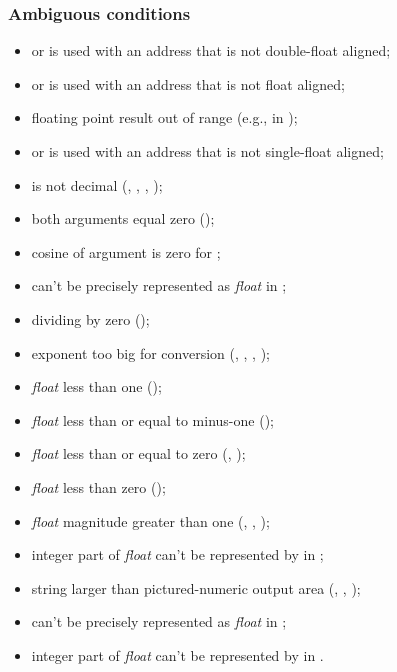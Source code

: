 \subsubsection{Ambiguous conditions} %
\label{float:ambiguous}
\begin{itemize}
\item {} or  is used with an address that is not
	double-float aligned;
\item {} or  is used with an address that is not
	float aligned;
\item floating point result out of range
	(e.g., in );
\item {} or  is used with an address that is not
	single-float aligned;
\item {} is not decimal
	(,
	 ,
	 ,
	 );
\item both arguments equal zero ();
\item cosine of argument is zero for ;
\item {} can't be precisely represented as \emph{float} in
	;
\item dividing by zero ();
\item exponent too big for conversion
	(,
	 ,
	 ,
	 );
\item \emph{float} less than one ();
\item \emph{float} less than or equal to minus-one
	();
\item \emph{float} less than or equal to zero
	(,
	 );
\item \emph{float} less than zero
	();
\item \emph{float} magnitude greater than one
	(,
	 ,
	 );
\item integer part of \emph{float} can't be represented by  in
	;
\item string larger than pictured-numeric output area
	(,
	 ,
	 );
\item {} can't be precisely represented as
	\emph{float} in ;
\item integer part of \emph{float} can't be represented
	by  in .
\end{itemize}


